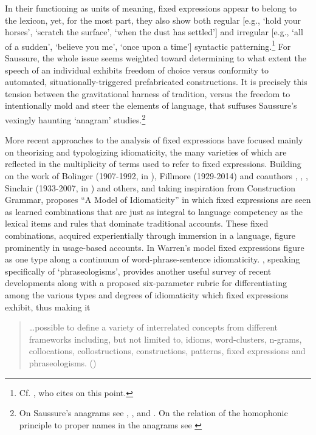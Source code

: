 \documentclass[output=paper]{langsci/langscibook}
\begin{document}
In their functioning as units of meaning, fixed expressions appear to belong to the lexicon, yet, for the most part, they also show both regular [e.g., ‘hold your horses’, ‘scratch the surface’, ‘when the dust has settled’] and irregular [e.g., ‘all of a sudden’, ‘believe you me’, ‘once upon a time’] syntactic patterning.\footnote{{Cf. \citet[2-3]{wood_formulaic_2002}, who cites \citet[36]{richards_two_1983} on this point.}} For Saussure, the whole issue seems weighted toward determining to what extent the speech of an individual exhibits freedom of choice versus conformity to automated, situationally-triggered prefabricated constructions. It is precisely this tension between the gravitational harness of tradition, versus the freedom to intentionally mold and steer the elements of language, that suffuses Saussure’s vexingly haunting ‘anagram’ studies.\footnote{ \textrm{On Saussure’s anagrams see \citealt{guimaraes_presence_2007}, \citeyear{christy_saussures_1999}, and \citeyear{carr_c_1999}. On the relation of the homophonic principle to proper names in the anagrams see \citealt{christy_concept_1995}}}

More recent approaches to the analysis of fixed expressions have focused mainly on theorizing and typologizing idiomaticity, the many varieties of which are reflected in the multiplicity of terms used to refer to fixed expressions. Building on the work of Bolinger (1907-1992, in \citeyear{bolinger_meaning_1976}), Fillmore (1929-2014) and coauthors \citeyear{fillmore_regularity_1988}, \citet{makkai_idiom_1972}, \citet{richards_two_1983}, Sinclair (1933-2007, in \citeyear{sinclair_corpus_1991}) and others, and taking inspiration from Construction Grammar, \citet{warren_model_2005} proposes “A Model of Idiomaticity” in which fixed expressions are seen as learned combinations that are just as integral to language competency as the lexical items and rules that dominate traditional accounts. These fixed combinations, acquired experientially through immersion in a language, figure prominently in usage-based accounts. In Warren’s model fixed expressions figure as one type along a continuum of word-phrase-sentence idiomaticity. \citet{granger_phraseology_2008}, speaking specifically of ‘phraseologisms’, provides another useful survey of recent developments along with a proposed six-parameter rubric for differentiating among the various types and degrees of idiomaticity which fixed expressions exhibit, thus making it 

\begin{quote}
    …possible to define a variety of interrelated concepts from different frameworks including, but not limited to, idioms, word-clusters, n-grams, collocations, collostructions, constructions, patterns, fixed expressions and phraseologisms. (\citealt[21]{granger_phraseology_2008})
\end{quote}
\end{document}
